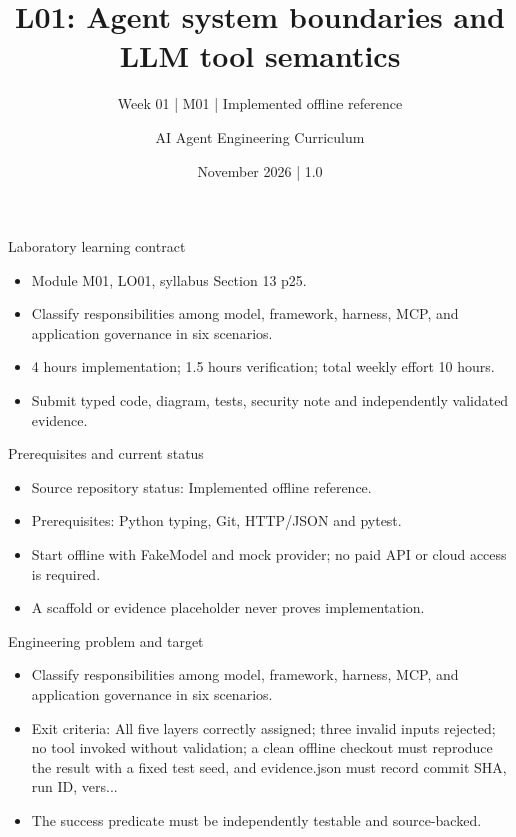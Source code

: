 \documentclass[aspectratio=169,10pt]{beamer}
\title[L01 - Agent Engineering]{L01: Agent system boundaries and LLM tool semantics}
\subtitle{Week 01 | M01 | Implemented offline reference}
\author{AI Agent Engineering Curriculum}
\date{November 2026 | 1.0}
\begin{document}
\begin{frame}\titlepage\end{frame}

\begin{frame}{Laboratory learning contract}
\small
\begin{itemize}
\item Module M01, LO01, syllabus Section 13 p25.
\item Classify responsibilities among model, framework, harness, MCP, and application governance in six scenarios.
\item 4 hours implementation; 1.5 hours verification; total weekly effort 10 hours.
\item Submit typed code, diagram, tests, security note and independently validated evidence.
\end{itemize}

\end{frame}

\begin{frame}{Prerequisites and current status}
\small
\begin{itemize}
\item Source repository status: Implemented offline reference.
\item Prerequisites: Python typing, Git, HTTP/JSON and pytest.
\item Start offline with FakeModel and mock provider; no paid API or cloud access is required.
\item A scaffold or evidence placeholder never proves implementation.
\end{itemize}

\end{frame}

\begin{frame}{Engineering problem and target}
\small
\begin{itemize}
\item Classify responsibilities among model, framework, harness, MCP, and application governance in six scenarios.
\item Exit criteria: All five layers correctly assigned; three invalid inputs rejected; no tool invoked without validation; a clean offline checkout must reproduce the result with a fixed test seed, and evidence.json must record commit SHA, run ID, vers...
\item The success predicate must be independently testable and source-backed.
\end{itemize}

\end{frame}
\end{document}
